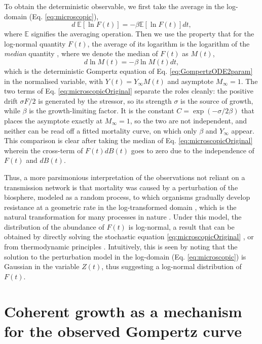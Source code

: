 \documentclass{article}
\begin{document}
To obtain the deterministic observable, we first take the average in the log-domain (Eq. \ref{eq:microscopic}), 
\begin{equation}
d \;\mathbb E[\ln{F(t)}] = -\beta \mathbb E[\ln{F(t)}] dt,
\end{equation}
where $\mathbb E$ signifies the averaging operation.
Then we use the property that for the log-normal quantity $F(t)$, the average of its logarithm is the logarithm of the \emph{median} quantity \cite{petroni2020gompertz}, where we denote the median of $F(t)$ as $M(t)$, 
\begin{equation}
\label{eq:medianGomp}
d\ln{M(t)} = -\beta \ln{M(t)} dt,
\end{equation}
which is the deterministic Gompertz equation of Eq. \ref{eq:GompertzODE2param} in the normalised variable, with $Y(t) = Y_\infty M(t)$ and asymptote $M_\infty = 1$. 
The two terms of Eq. \ref{eq:microscopicOriginal} separate the roles cleanly: the positive drift $\sigma F/2$ is generated by the stressor, so its strength $\sigma$ is the source of growth, while $\beta$ is the growth-limiting factor. It is the constant $C=\exp(-\sigma/2\beta)$ that places the asymptote exactly at $M_\infty=1$, so the two are not independent, and neither can be read off a fitted mortality curve, on which only $\beta$ and $Y_{\infty}$ appear. This comparison is clear after taking the median of Eq. \ref{eq:microscopicOriginal} wherein the cross-term of $F(t)dB(t)$ goes to zero due to the independence of $F(t)$ and $dB(t)$.

Thus, a more parsimonious interpretation of the observations not reliant on a transmission network is that mortality was caused by a perturbation of the biosphere, modeled as a random process, to which organisms gradually develop resistance at a geometric rate in the log-transformed domain \cite{boxenbaum2017hypotheses,neafsey1988gompertz}, which is the natural transformation for many processes in nature \cite{zhang1994log}. 
Under this model, the distribution of the abundance of $F(t)$ is log-normal, a result that can be obtained by directly solving the stochastic equation \ref{eq:microscopicOriginal} \cite{skiadas2010exact,petroni2020gompertz}, or from thermodynamic principles \cite{sitaram1984statistical,gunasekaran1982lon,chakrabarti1996non}. 
Intuitively, this is seen by noting that the solution to the perturbation model in the log-domain (Eq. \ref{eq:microscopic}) is Gaussian in the variable $Z(t)$, thus suggesting a log-normal distribution of $F(t)$.

\section*{Coherent growth as a mechanism for the observed Gompertz curve}
\end{document}
